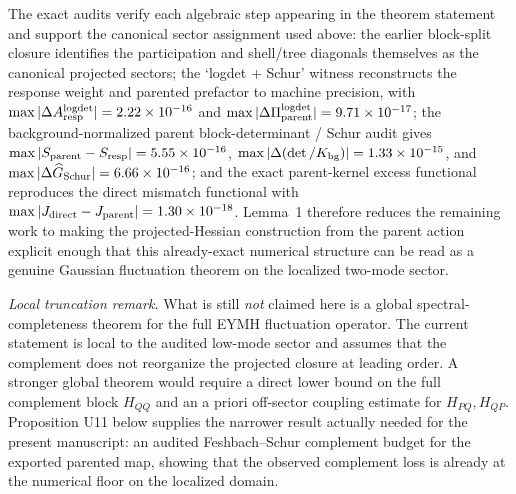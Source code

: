 \documentclass[aps,prd,onecolumn,notitlepage,nofootinbib,superscriptaddress,11pt,floatfix]{revtex4-2}
\begin{document}
The exact audits verify each algebraic step appearing in the theorem statement and support the canonical sector assignment used above: the earlier block-split closure identifies the participation and shell/tree diagonals themselves as the canonical projected sectors; the `logdet + Schur' witness reconstructs the response weight and parented prefactor to machine precision, with \(\max|\Delta A_{\rm resp}^{\rm logdet}|=2.22\times10^{-16}\) and \(\max|\Delta\Pi_{\rm parent}^{\rm logdet}|=9.71\times10^{-17}\); the background-normalized parent block-determinant / Schur audit gives \(\max|S_{\rm parent}-S_{\rm resp}|=5.55\times10^{-16}\), \(\max|\Delta(\det/K_{\rm bg})|=1.33\times10^{-15}\), and \(\max|\Delta \widehat G_{\rm Schur}|=6.66\times10^{-16}\); and the exact parent-kernel excess functional reproduces the direct mismatch functional with \(\max|J_{\rm direct}-J_{\rm parent}|=1.30\times10^{-18}\). Lemma~1 therefore reduces the remaining work to making the projected-Hessian construction from the parent action explicit enough that this already-exact numerical structure can be read as a genuine Gaussian fluctuation theorem on the localized two-mode sector.

\emph{Local truncation remark.}
What is still \emph{not} claimed here is a global spectral-completeness theorem for the full EYMH fluctuation operator. The current statement is local to the audited low-mode sector and assumes that the complement does not reorganize the projected closure at leading order. A stronger global theorem would require a direct lower bound on the full complement block \(H_{QQ}\) and an a priori off-sector coupling estimate for \(H_{PQ},H_{QP}\). Proposition U11 below supplies the narrower result actually needed for the present manuscript: an audited Feshbach--Schur complement budget for the exported parented map, showing that the observed complement loss is already at the numerical floor on the localized domain.
\end{document}
